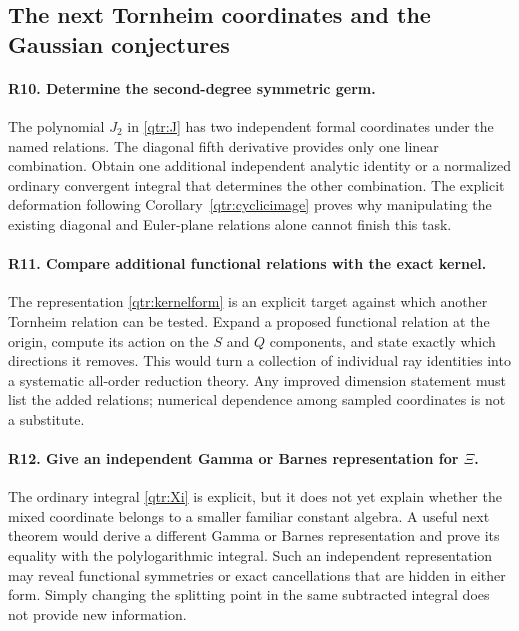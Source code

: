 \subsection{The next Tornheim coordinates and the Gaussian conjectures}

\paragraph{R10. Determine the second-degree symmetric germ.}
The polynomial $J_2$ in \eqref{qtr:J} has two independent
formal coordinates under the named relations.
The diagonal fifth derivative provides only one linear
combination. Obtain one additional independent analytic
identity or a normalized ordinary convergent integral
that determines the other combination. The explicit
deformation following Corollary~\ref{qtr:cyclicimage}
proves why manipulating the existing diagonal and
Euler-plane relations alone cannot finish this task.

\paragraph{R11. Compare additional functional relations with the exact kernel.}
The representation \eqref{qtr:kernelform} is an explicit
target against which another Tornheim relation can be
tested. Expand a proposed functional relation at the
origin, compute its action on the $S$ and $Q$ components,
and state exactly which directions it removes. This
would turn a collection of individual ray identities
into a systematic all-order reduction theory. Any
improved dimension statement must list the added
relations; numerical dependence among sampled
coordinates is not a substitute.

\paragraph{R12. Give an independent Gamma or Barnes representation for \(\Xi\).}
The ordinary integral \eqref{qtr:Xi} is explicit, but it
does not yet explain whether the mixed coordinate
belongs to a smaller familiar constant algebra.
A useful next theorem would derive a different Gamma
or Barnes representation and prove its equality with
the polylogarithmic integral. Such an independent
representation may reveal functional symmetries or
exact cancellations that are hidden in either form.
Simply changing the splitting point in the same
subtracted integral does not provide new information.

